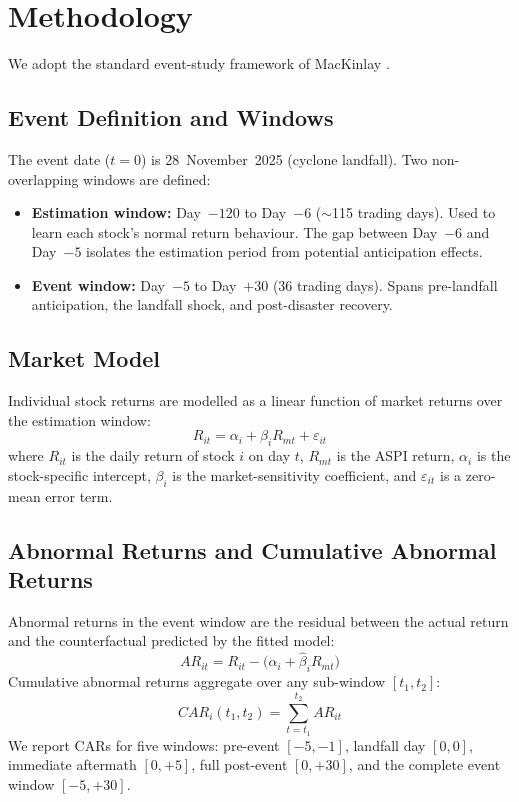 \documentclass[sigconf, nonacm]{acmart}
\begin{document}
\section{Methodology}

We adopt the standard event-study framework of MacKinlay \cite{mackinlay1997}.

\subsection{Event Definition and Windows}
The event date ($t = 0$) is 28~November~2025 (cyclone landfall). Two non-overlapping windows are defined:
\begin{itemize}
    \item \textbf{Estimation window:} Day~$-120$ to Day~$-6$ ($\sim$115 trading days). Used to learn each stock's normal return behaviour. The gap between Day~$-6$ and Day~$-5$ isolates the estimation period from potential anticipation effects.
    \item \textbf{Event window:} Day~$-5$ to Day~$+30$ (36 trading days). Spans pre-landfall anticipation, the landfall shock, and post-disaster recovery.
\end{itemize}

\subsection{Market Model}
Individual stock returns are modelled as a linear function of market returns over the estimation window:
\begin{equation}
  R_{it} = \alpha_i + \beta_i R_{mt} + \varepsilon_{it}
  \label{eq:market-model}
\end{equation}
where $R_{it}$ is the daily return of stock $i$ on day $t$, $R_{mt}$ is the ASPI return, $\alpha_i$ is the stock-specific intercept, $\beta_i$ is the market-sensitivity coefficient, and $\varepsilon_{it}$ is a zero-mean error term.

\subsection{Abnormal Returns and Cumulative Abnormal Returns}
Abnormal returns in the event window are the residual between the actual return and the counterfactual predicted by the fitted model:
\begin{equation}
  AR_{it} = R_{it} - \bigl(\hat{\alpha}_i + \hat{\beta}_i R_{mt}\bigr)
  \label{eq:ar}
\end{equation}
Cumulative abnormal returns aggregate over any sub-window $[t_1, t_2]$:
\begin{equation}
  CAR_i(t_1, t_2) = \sum_{t=t_1}^{t_2} AR_{it}
  \label{eq:car}
\end{equation}
We report CARs for five windows: pre-event $[-5,-1]$, landfall day $[0,0]$, immediate aftermath $[0,+5]$, full post-event $[0,+30]$, and the complete event window $[-5,+30]$.
\end{document}
